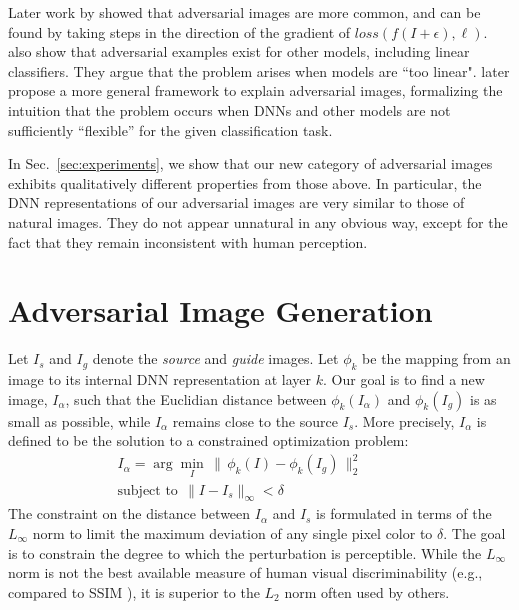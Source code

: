 \documentclass{article} %
\begin{document}
Later work by \cite{GoodfellowEtalICLR2015} showed that adversarial images
are more common, and can be found by taking steps in the direction of the
gradient of $loss(f(I+\epsilon), \ell)$.  \cite{GoodfellowEtalICLR2015}
also show that adversarial examples exist for other models, including
linear classifiers.  They argue that the problem arises when models
are ``too linear". \cite{FawziEtalICLR2015} later propose a more general
framework to explain adversarial images,
formalizing the intuition that the problem occurs when DNNs and other
models are not sufficiently ``flexible'' for the given classification task.

In Sec.~\ref{sec:experiments}, we show that our new category of adversarial
images exhibits qualitatively different properties from those above.
In particular, the DNN representations of our adversarial images are
very similar to those of natural images.  They do not appear unnatural
in any obvious way, except for the fact that they remain inconsistent
with human perception.

\section{Adversarial Image Generation}\label{method}

Let $I_s$ and $I_g$ denote the {\em source} and {\em guide} images.
Let $\phi_k$ be the mapping from an image to its internal DNN representation
at layer $k$.  Our goal is to find a new image, $I_\alpha$, such that
the Euclidian distance between $\phi_k(I_\alpha)$ and $\phi_k(I_g)$ is
as small as possible, while $I_\alpha$ remains close to the source $I_s$.
More precisely, $I_\alpha$ is defined to be the solution to a
constrained optimization problem:
\begin{align}
I_{\alpha} = \arg\min_{I} \,  \| \, \phi_k(I)-\phi_k(I_g) \,\|^{2}_2 &
\phantom{=E}
\label{adv_objective} \\
\text{subject to}~~ \| I - I_s \|_{\infty} < \delta &\phantom{=E}
\label{infnorm_bound}
\end{align}
The constraint on the distance between $I_\alpha$ and $I_s$ is formulated
in terms of the $L_{\infty}$ norm to limit the maximum deviation of any
single pixel color to $\delta$.  The goal is to constrain the degree
to which the perturbation is perceptible.  While the $L_\infty$
norm is not the best available measure of human visual discriminability
(e.g., compared to SSIM \citep{WangEtalPAMI2004}), it is superior to
the $L_2$ norm often used by others.
\end{document}
